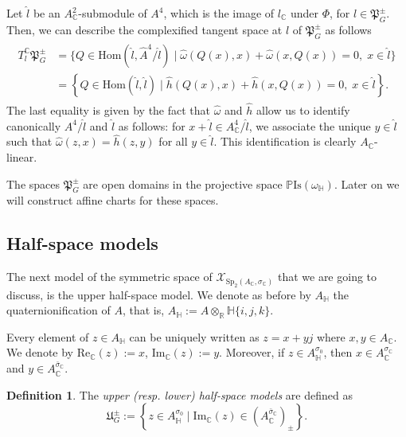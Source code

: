 \documentclass[oneside,11pt]{amsart}
\theoremstyle{definition}
\newtheorem{defn}[thm]{Definition}
\theoremstyle{remark}
\numberwithin{thm}{section}
\numberwithin{equation}{section}
\begin{document}
Let $\hat l$ be an $A_\mathbb C^2$-submodule of $A^4$, which is the image of $l_\mathbb C$ under $\Phi$, for $l\in \mathfrak{P}_G^\pm$. Then, we can describe the complexified tangent space at $l$ of $\mathfrak{P}_G^\pm$ as follows
\begin{align}
\begin{aligned}\label{eq:spc_proj_comp.tangent}
    T_l^\mathbb C\mathfrak{P}_G^\pm
    &=\{Q\in\mathrm{Hom}(\hat l,\hat A^4/\hat l)\mid \hat \omega(Q(x),x)+\hat \omega(x,Q(x))=0,\;x\in\hat l\}\\
    &=\left\{Q\in\mathrm{Hom}(\hat l,\hat l)\mid \hat h(Q(x),x)+ \hat h(x,Q(x))=0,\;x\in\hat l\right\}.    
\end{aligned}
\end{align}
The last equality is given by the fact that $\hat\omega$ and $\hat h$ allow us to identify canonically $A^4/\hat l$ and $\hat l$ as follows: for $x+\hat l\in A_\mathbb C^4/\hat l$, we associate the unique $y\in \hat l$ such that $\hat\omega(z,x)=\hat h(z,y)$ for all $y\in \hat l$. This identification is clearly $A_\mathbb C$-linear.

The spaces $\mathfrak{P}_G^\pm$ are open domains in  the projective space $\mathbb{P}\mathrm{Is}(\omega_\mathbb H)$. Later on we will construct affine charts for these spaces. 

\subsection{Half-space models}\label{sec:upperhalf_complex}

The next model of the symmetric space of $\mathcal X_{\mathrm{Sp}_2(A_\mathbb{C},\sigma_\mathbb{C})}$ that we are going to discuss, is the upper half-space model. We denote as before by $A_\mathbb H$ the quaternionification of $A$, that is, $A_\mathbb{H}:=A\otimes_\mathbb R\mathbb H\{i,j,k\}$.

Every element of $z\in A_\mathbb{H}$ can be uniquely written as $z=x+yj$ where $x,y\in A_\mathbb C$. We denote by $\mathrm{Re}_\mathbb C(z):=x$, $\mathrm{Im}_\mathbb C(z):=y$. Moreover, if $z\in A_\mathbb{H}^{\sigma_0}$, then $x\in A_\mathbb C^{\sigma_\mathbb C}$ and $y\in A_{\mathbb C}^{\bar\sigma_\mathbb C}$.

\begin{defn}
    The \emph{upper (resp. lower) half-space models} are defined as
    $$\mathfrak{U}_G^\pm:=\left\{z\in A_\mathbb H^{\sigma_0}\mid \mathrm{Im}_\mathbb C(z)\in (A_\mathbb C^{\bar\sigma_\mathbb C})_\pm\right\}.$$
\end{defn}
\end{document}
